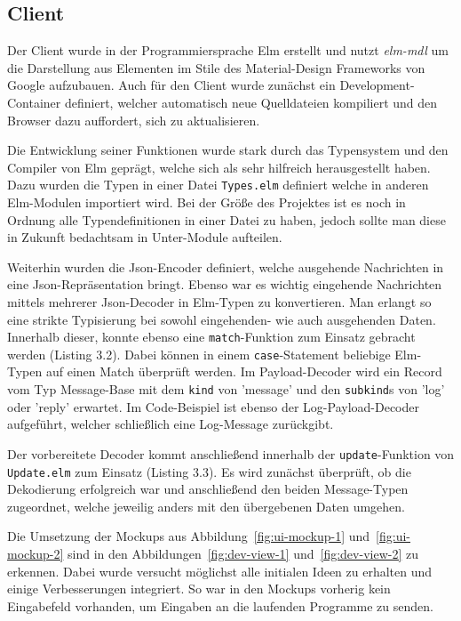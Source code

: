\subsection{Client}
Der Client wurde in der Programmiersprache Elm erstellt und nutzt \textit{elm-mdl} um die Darstellung aus Elementen im Stile des Material-Design Frameworks von Google aufzubauen.
Auch für den Client wurde zunächst ein Development-Container definiert, welcher automatisch neue Quelldateien kompiliert und den Browser dazu auffordert, sich zu aktualisieren.
\par
Die Entwicklung seiner Funktionen wurde stark durch das Typensystem und den Compiler von Elm geprägt, welche sich als sehr hilfreich herausgestellt haben.
Dazu wurden die Typen in einer Datei \texttt{Types.elm} definiert welche in anderen Elm-Modulen importiert wird.
Bei der Größe des Projektes ist es noch in Ordnung alle Typendefinitionen in einer Datei zu haben, jedoch sollte man diese in Zukunft bedachtsam in Unter-Module aufteilen.
\par
Weiterhin wurden die Json-Encoder definiert, welche ausgehende Nachrichten in eine Json-Repräsentation bringt.
Ebenso war es wichtig eingehende Nachrichten mittels mehrerer Json-Decoder in Elm-Typen zu konvertieren.
Man erlangt so eine strikte Typisierung bei sowohl eingehenden- wie auch  ausgehenden Daten.
Innerhalb dieser, konnte ebenso eine \texttt{match}-Funktion zum Einsatz gebracht werden (Listing 3.2).
Dabei können in einem \texttt{case}-Statement beliebige Elm-Typen auf einen Match überprüft werden.
Im Payload-Decoder wird ein Record vom Typ Message-Base mit dem \texttt{kind} von 'message' und den \texttt{subkind}s von 'log' oder 'reply' erwartet.
Im Code-Beispiel ist ebenso der Log-Payload-Decoder aufgeführt, welcher schließlich eine Log-Message zurückgibt.
\par Der vorbereitete Decoder kommt anschließend innerhalb der \texttt{update}-Funktion von \texttt{Update.elm} zum Einsatz (Listing 3.3).
Es wird zunächst überprüft, ob die Dekodierung erfolgreich war und anschließend den beiden Message-Typen zugeordnet, welche jeweilig anders mit den übergebenen Daten umgehen.
\par Die Umsetzung der Mockups aus Abbildung~\ref{fig:ui-mockup-1} und~\ref{fig:ui-mockup-2} sind in den Abbildungen~\ref{fig:dev-view-1} und~\ref{fig:dev-view-2} zu erkennen.
Dabei wurde versucht möglichst alle initialen Ideen zu erhalten und einige Verbesserungen integriert.
So war in den Mockups vorherig kein Eingabefeld vorhanden, um Eingaben an die laufenden Programme zu senden.

